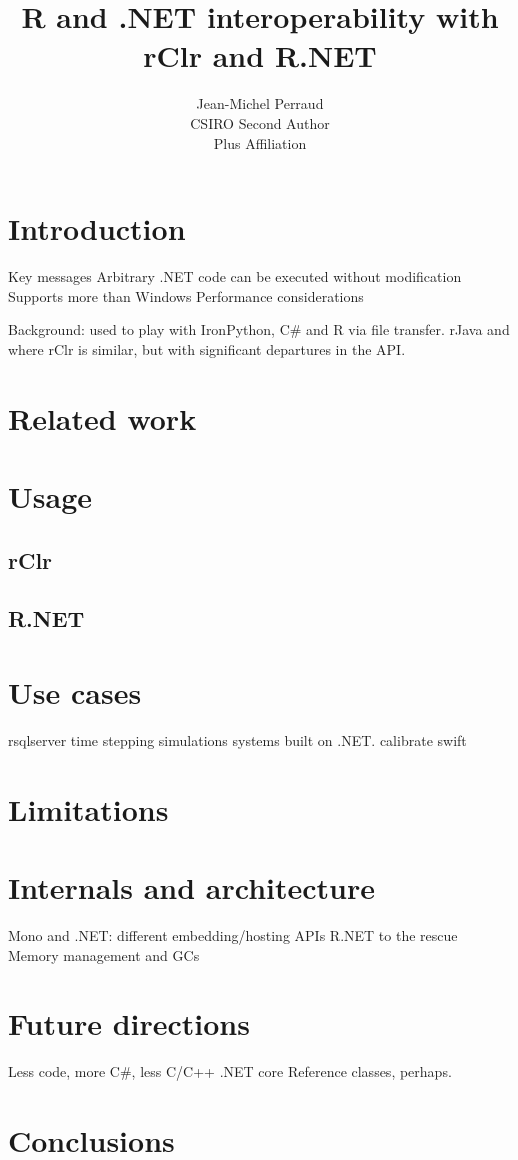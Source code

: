 \documentclass[codesnippet]{jss}
\author{Jean-Michel Perraud\\CSIRO \And 
        Second Author\\Plus Affiliation}
\title{R and .NET interoperability with rClr and R.NET}
\begin{document}
\maketitle

\section{Introduction}
Key messages
Arbitrary .NET code can be executed without modification
Supports more than Windows
Performance considerations

Background: 
used to play with IronPython, C# and R via file transfer. 
rJava and where rClr is similar, but with significant departures in the API.

\section{Related work}

\section{Usage}

\subsection{rClr}

\subsection{R.NET}

\section{Use cases}
rsqlserver
time stepping simulations systems built on .NET. 
calibrate swift

\section{Limitations}

\section{Internals and architecture}
Mono and .NET: different embedding/hosting APIs
R.NET to the rescue
Memory management and GCs

\section{Future directions}
Less code, more C#, less C/C++
.NET core
Reference classes, perhaps.

\section{Conclusions}
\end{document}

